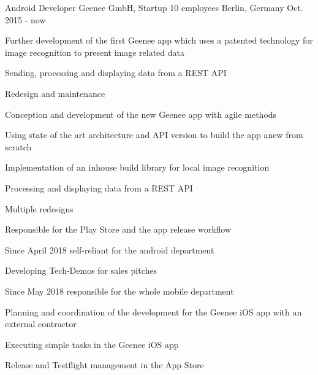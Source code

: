 

\begin{cventries}

  \cventry
    {Android Developer} %
    {Geenee GmbH, Startup 10 employees} %
    {Berlin, Germany} %
    {Oct. 2015 - now} %
    {
      \begin{cvitems} %
        \item {Further development of the first Geenee app which uses a patented technology for image recognition to present image related data}
        \begin{cvsubitems}
          \item {Sending, processing and displaying data from a REST API}
          \item {Redesign and maintenance}
        \end{cvsubitems}
        \item {Conception and development of the new Geenee app with agile methods}
        \begin{cvsubitems}
          \item {Using state of the art architecture and API version to build the app anew from scratch}
          \item {Implementation of an inhouse build library for local image recognition}
          \item {Processing and displaying data from a REST API}
          \item {Multiple redesigns}
          \item {Responsible for the Play Store and the app release workflow}
          \item {Since April 2018 self-reliant for the android department}
        \end{cvsubitems}
        \item {Developing Tech-Demos for sales pitches}
        \item {Since May 2018 responsible for the whole mobile department}
        \begin{cvsubitems}
        \item {Planning and coordination of the development for the Geenee iOS app with an external contractor}
        \item {Executing simple tasks in the Geenee iOS app}
        \item {Release and Testflight management in the App Store}
        \end{cvsubitems}
      \end{cvitems}
    }


\end{cventries}
